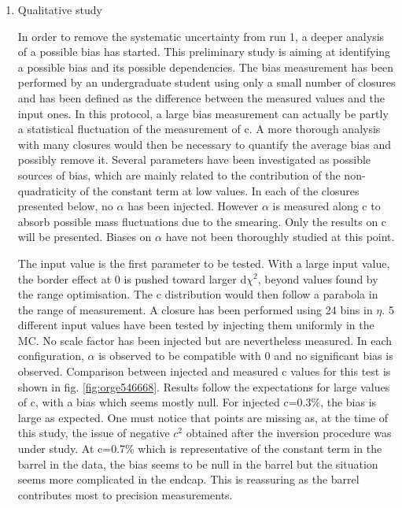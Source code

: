 \begin{enumerate}
\item Qualitative study
\label{sec:orge82a247}

In order to remove the systematic uncertainty from run 1, a deeper analysis of a possible bias has started.
This preliminary study is aiming at identifying a possible bias and its possible dependencies.
The bias measurement has been performed by an undergraduate student \cite{Rode_150507,Rode2015} using only a small number of closures and has been defined as the difference between the measured values and the input ones.
In this protocol, a large bias measurement can actually be partly a statistical fluctuation of the measurement of c.
A more thorough analysis with many closures would then be necessary to quantify the average bias and possibly remove it.
Several parameters have been investigated as possible sources of bias, which are mainly related to the contribution of the non-quadraticity of the constant term at low values.
In each of the closures presented below, no \(\alpha\) has been injected.
However \(\alpha\) is measured along c to absorb possible mass fluctuations due to the smearing.
Only the results on c will be presented.
Biases on \(\alpha\) have not been thoroughly studied at this point.

The input value is the first parameter to be tested.
With a large input value, the border effect at 0 is pushed toward larger d$\chi^2$, beyond values found by the range optimisation.
The c distribution would then follow a parabola in the range of measurement.
A closure has been performed using 24 bins in $\eta$.
5 different input values have been tested by injecting them uniformly in the MC.
No scale factor has been injected but are nevertheless measured.
In each configuration, \(\alpha\) is observed to be compatible with 0 and no significant bias is observed.
Comparison between injected and measured c values for this test is shown in fig. \ref{fig:orge546668}.
Results follow the expectations for large values of c, with a bias which seems mostly null.
For injected c=0.3\%, the bias is large as expected.
One must notice that points are missing as, at the time of this study, the issue of negative $c^2$ obtained after the inversion procedure was under study.
At c=0.7\% which is representative of the constant term in the barrel in the data, the bias seems to be null in the barrel but the situation seems more complicated in the endcap.
This is reassuring as the barrel contributes most to precision measurements.


\end{enumerate}
